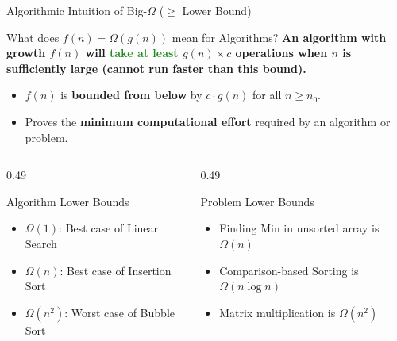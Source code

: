 \documentclass[aspectratio=169]{beamer}
\begin{document}
\begin{frame}{Algorithmic Intuition of Big-$\Omega$ ($\ge$ Lower Bound)}
  \begin{alertblock}{What does $f(n) = \Omega(g(n))$ mean for Algorithms?}
    \small
    \textbf{An algorithm with growth $f(n)$ will \textcolor{ForestGreen}{take at least} $g(n) \times c$ operations when $n$ is sufficiently large (cannot run faster than this bound).}
    \begin{itemize}
      \item $f(n)$ is \textbf{bounded from below} by $c \cdot g(n)$ for all $n \ge n_0$.
      \item Proves the \textbf{minimum computational effort} required by an algorithm or problem.
    \end{itemize}
  \end{alertblock}
  \vspace{0.2em}
  \begin{columns}[T]
    \begin{column}{0.49\textwidth}
      \begin{block}{Algorithm Lower Bounds}
        \scriptsize
        \begin{itemize}\setlength{\itemsep}{0.2em}
          \item $\Omega(1)$: Best case of Linear Search
          \item $\Omega(n)$: Best case of Insertion Sort
          \item $\Omega(n^2)$: Worst case of Bubble Sort
        \end{itemize}
      \end{block}
    \end{column}
    \begin{column}{0.49\textwidth}
      \begin{block}{Problem Lower Bounds}
        \scriptsize
        \begin{itemize}\setlength{\itemsep}{0.2em}
          \item Finding Min in unsorted array is $\Omega(n)$
          \item Comparison-based Sorting is $\Omega(n\log n)$
          \item Matrix multiplication is $\Omega(n^2)$
        \end{itemize}
      \end{block}
    \end{column}
  \end{columns}
\end{frame}
\end{document}
